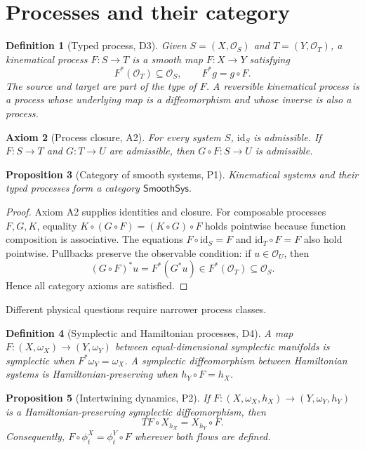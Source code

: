 \documentclass[11pt]{article}
\newtheorem{definition}{Definition}[section]
\newtheorem{axiom}[definition]{Axiom}
\newtheorem{proposition}[definition]{Proposition}
\newcommand{\id}{\mathrm{id}}
\newcommand{\Obs}{\mathcal{O}}
\newcommand{\Smooth}{\mathsf{SmoothSys}}
\begin{document}
\section{Processes and their category}

\begin{definition}[Typed process, D3]
Given $S=(X,\Obs_S)$ and $T=(Y,\Obs_T)$, a \emph{kinematical process} $F:S\to T$ is a smooth map $F:X\to Y$ satisfying
\[
 F^*(\Obs_T)\subseteq\Obs_S,
 \qquad F^*g=g\circ F.
\]
The source and target are part of the type of $F$. A \emph{reversible kinematical process} is a process whose underlying map is a diffeomorphism and whose inverse is also a process.
\end{definition}

\begin{axiom}[Process closure, A2]
For every system $S$, $\id_S$ is admissible. If $F:S\to T$ and $G:T\to U$ are admissible, then $G\circ F:S\to U$ is admissible.
\end{axiom}

\begin{proposition}[Category of smooth systems, P1]
Kinematical systems and their typed processes form a category $\Smooth$.
\end{proposition}

\begin{proof}
Axiom A2 supplies identities and closure. For composable processes $F,G,K$, equality
$K\circ(G\circ F)=(K\circ G)\circ F$ holds pointwise because function composition is associative. The equations $F\circ\id_S=F$ and $\id_T\circ F=F$ also hold pointwise. Pullbacks preserve the observable condition: if $u\in\Obs_U$, then
\[
 (G\circ F)^*u=F^*(G^*u)\in F^*(\Obs_T)\subseteq\Obs_S.
\]
Hence all category axioms are satisfied.
\end{proof}

Different physical questions require narrower process classes.

\begin{definition}[Symplectic and Hamiltonian processes, D4]
A map $F:(X,\omega_X)\to(Y,\omega_Y)$ between equal-dimensional symplectic manifolds is \emph{symplectic} when $F^*\omega_Y=\omega_X$. A symplectic diffeomorphism between Hamiltonian systems is \emph{Hamiltonian-preserving} when $h_Y\circ F=h_X$.
\end{definition}

\begin{proposition}[Intertwining dynamics, P2]
If $F:(X,\omega_X,h_X)\to(Y,\omega_Y,h_Y)$ is a Hamiltonian-preserving symplectic diffeomorphism, then
\[
 TF\circ X_{h_X}=X_{h_Y}\circ F.
\]
Consequently, $F\circ\phi_t^X=\phi_t^Y\circ F$ wherever both flows are defined.
\end{proposition}
\end{document}
